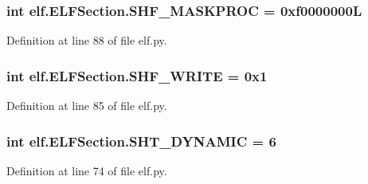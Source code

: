 \subsubsection[{\texorpdfstring{S\+H\+F\+\_\+\+M\+A\+S\+K\+P\+R\+OC}{SHF_MASKPROC}}]{\setlength{\rightskip}{0pt plus 5cm}int elf.\+E\+L\+F\+Section.\+S\+H\+F\+\_\+\+M\+A\+S\+K\+P\+R\+OC = 0xf0000000L\hspace{0.3cm}{\ttfamily [static]}}\hypertarget{clasself_1_1_e_l_f_section_ae3983d0742b6f24c08d0718109ac1e53}{}\label{clasself_1_1_e_l_f_section_ae3983d0742b6f24c08d0718109ac1e53}


Definition at line 88 of file elf.\+py.

\subsubsection[{\texorpdfstring{S\+H\+F\+\_\+\+W\+R\+I\+TE}{SHF_WRITE}}]{\setlength{\rightskip}{0pt plus 5cm}int elf.\+E\+L\+F\+Section.\+S\+H\+F\+\_\+\+W\+R\+I\+TE = 0x1\hspace{0.3cm}{\ttfamily [static]}}\hypertarget{clasself_1_1_e_l_f_section_a5f4ebc29be03b1d1770df14a7eb96040}{}\label{clasself_1_1_e_l_f_section_a5f4ebc29be03b1d1770df14a7eb96040}


Definition at line 85 of file elf.\+py.

\subsubsection[{\texorpdfstring{S\+H\+T\+\_\+\+D\+Y\+N\+A\+M\+IC}{SHT_DYNAMIC}}]{\setlength{\rightskip}{0pt plus 5cm}int elf.\+E\+L\+F\+Section.\+S\+H\+T\+\_\+\+D\+Y\+N\+A\+M\+IC = 6\hspace{0.3cm}{\ttfamily [static]}}\hypertarget{clasself_1_1_e_l_f_section_a365f52ae9bc967e7c133c275e3833420}{}\label{clasself_1_1_e_l_f_section_a365f52ae9bc967e7c133c275e3833420}


Definition at line 74 of file elf.\+py.


